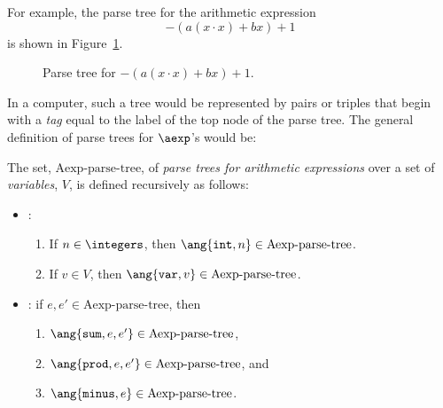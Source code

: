 \begin{definition}
\begin{editingnotes}
For example, the parse tree for the arithmetic expression
\begin{equation}\label{ax}
-(a(x\cdot x)+ bx) + 1
\end{equation}
is shown in Figure~\ref{fig:parse}.

\begin{figure}
\caption{Parse tree for $-(a(x\cdot x)+ bx) + 1$.}
\label{fig:parse}
\end{figure}

In a computer, such a tree would be represented by pairs or triples
that begin with a
\emph{tag} equal to the label of the top node of the parse tree.  
The general definition of parse trees for $\aexp$'s would be:

\newcommand{\paexp}{\text{Aexp-parse-tree}}

\begin{definition}\label{arithparse}
The set, $\paexp$, of \emph{parse trees for arithmetic expressions} 
over a set of
\emph{variables}, $V$, is defined recursively as follows:
\begin{itemize}
\item {}:
\begin{enumerate}
\item If $n \in \integers$, then $\ang{\texttt{int}, n} \in \paexp$.
\item If $v \in V$, then $\ang{\texttt{var}, v} \in \paexp$.
\end{enumerate}
\item {}: if $e,e' \in \paexp$, then
\begin{enumerate}
\item $\ang{\texttt{sum}, e, e'} \in \paexp$,
\item $\ang{\texttt{prod}, e, e'} \in \paexp$, and
\item $\ang{\texttt{minus}, e} \in \paexp$.
\end{enumerate}
\end{itemize}
\end{definition}


\end{editingnotes}
\end{definition}
